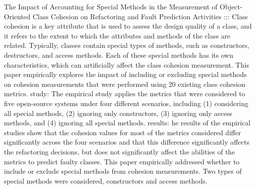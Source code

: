 The Impact of Accounting for Special Methods in the Measurement of
Object-Oriented Class Cohesion on Refactoring and Fault Prediction
Activities ::: \cite{b4al2012impact}
Class cohesion is a key attribute that is used to assess the design quality of a class, and it
refers to the extent to which the attributes and methods of the class are related. Typically,
classes contain special types of methods, such as constructors, destructors, and access
methods. Each of these special methods has its own characteristics, which can artificially
affect the class cohesion measurement.
This paper empirically explores the impact of including or
excluding special methods on cohesion measurements that were performed using 20
existing class cohesion metrics.
study: The empirical study applies the metrics that were
considered to five open-source systems under four different scenarios, including (1)
considering all special methods, (2) ignoring only constructors, (3) ignoring only access
methods, and (4) ignoring all special methods.
results: he results of
the empirical studies show that the cohesion values for most of the metrics considered
differ significantly across the four scenarios and that this difference significantly affects
the refactoring decisions, but does not significantly affect the abilities of the metrics to predict faulty classes.
This paper empirically addressed whether to include or exclude special methods from
cohesion measurements. Two types of special methods were considered, constructors and
access methods.



